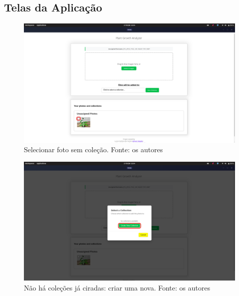 \subsection{Telas da Aplicação}

\begin{figure}[H]
    \centering
    \includegraphics[width=1\textwidth]{../figures/screens/uc003/Screenshot from 2025-06-27 22-04-12.png}
    \caption{Selecionar foto sem coleção. Fonte: os autores}
    \label{fig:uc003-screen1}
\end{figure}

\begin{figure}[H]
    \centering
    \includegraphics[width=1\textwidth]{../figures/screens/uc003/Screenshot from 2025-06-27 22-04-19.png}
    \caption{Não há coleções já ciradas: criar uma nova. Fonte: os autores}
    \label{fig:uc003-screen2}
\end{figure}

